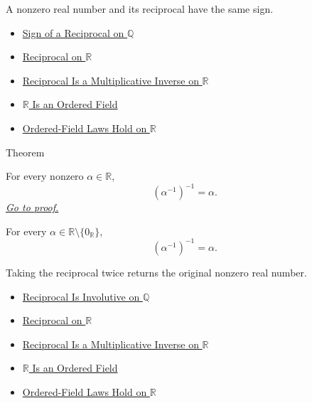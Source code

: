 \begin{remark*}[Interpretation]
A nonzero real number and its reciprocal have the same sign.
\end{remark*}

\begin{dependencies}
\begin{itemize}
  \item \hyperref[thm:sign-of-reciprocal-q]{Sign of a Reciprocal on $\mathbb{Q}$}
  \item \hyperref[def:reciprocal-on-r]{Reciprocal on $\mathbb{R}$}
  \item \hyperref[thm:reciprocal-multiplicative-inverse-on-r]{Reciprocal Is a Multiplicative Inverse on $\mathbb{R}$}
  \item \hyperref[thm:r-is-an-ordered-field]{$\mathbb{R}$ Is an Ordered Field}
  \item \hyperref[cor:ordered-field-laws-on-r]{Ordered-Field Laws Hold on $\mathbb{R}$}
\end{itemize}
\end{dependencies}

\begin{theorembox}{Theorem}
\begin{theorem}
\label{thm:reciprocal-involutive-on-r}
For every nonzero $\alpha\in\mathbb{R}$,
\[
(\alpha^{-1})^{-1}=\alpha.
\]
\hyperref[prf:reciprocal-involutive-on-r]{\textit{Go to proof.}}
\end{theorem}
\end{theorembox}

\begin{remark*}
For every $\alpha\in\mathbb{R}\setminus\{0_{\mathbb{R}}\}$,
\[
(\alpha^{-1})^{-1}=\alpha.
\]
\end{remark*}

\begin{remark*}[Interpretation]
Taking the reciprocal twice returns the original nonzero real number.
\end{remark*}

\begin{dependencies}
\begin{itemize}
  \item \hyperref[thm:reciprocal-involutive-on-q]{Reciprocal Is Involutive on $\mathbb{Q}$}
  \item \hyperref[def:reciprocal-on-r]{Reciprocal on $\mathbb{R}$}
  \item \hyperref[thm:reciprocal-multiplicative-inverse-on-r]{Reciprocal Is a Multiplicative Inverse on $\mathbb{R}$}
  \item \hyperref[thm:r-is-an-ordered-field]{$\mathbb{R}$ Is an Ordered Field}
  \item \hyperref[cor:ordered-field-laws-on-r]{Ordered-Field Laws Hold on $\mathbb{R}$}
\end{itemize}
\end{dependencies}

